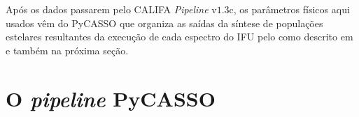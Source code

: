 Após os dados passarem pelo CALIFA {\em Pipeline} v$1.3$c, os parâmetros físicos
aqui usados vêm do PyCASSO que organiza as saídas da síntese de populações
estelares resultantes da execução de cada espectro do IFU pelo \starlight
\citep{CidFernandes2005} como descrito em \citet{CidFernandes2013a} e também na
próxima seção.


\section{O {\em pipeline} PyCASSO}
\label{sec:CALePyC:PyCASSO}

